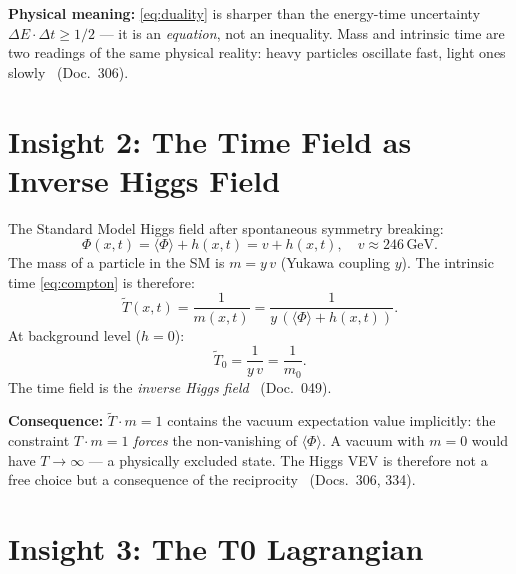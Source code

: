 \textbf{Physical meaning:} \eqref{eq:duality} is sharper than the
energy-time uncertainty $\Delta E \cdot \Delta t \geq 1/2$ --- it is an
\emph{equation}, not an inequality. Mass and intrinsic time are two readings
of the same physical reality: heavy particles oscillate fast, light ones
slowly \BM\ (Doc.~306).

\section{Insight 2: The Time Field as Inverse Higgs Field}

The Standard Model Higgs field after spontaneous symmetry breaking:
\begin{equation}
  \Phi(x,t) = \langle\Phi\rangle + h(x,t) = v + h(x,t),
  \quad v \approx 246\,\text{GeV}.
  \label{eq:higgs_field}
\end{equation}
The mass of a particle in the SM is $m = y\,v$ (Yukawa coupling $y$).
The intrinsic time \eqref{eq:compton} is therefore:
\begin{equation}
  \tilde{T}(x,t) = \frac{1}{m(x,t)} = \frac{1}{y\,(\langle\Phi\rangle + h(x,t))}.
  \label{eq:T_from_higgs}
\end{equation}
At background level ($h = 0$):
\begin{equation}
  \boxed{\tilde{T}_0 = \frac{1}{y\,v} = \frac{1}{m_0}.}
\end{equation}
The time field is the \emph{inverse Higgs field} \BM\ (Doc.~049).

\textbf{Consequence:} $\tilde{T}\cdot m = 1$ contains the vacuum expectation
value implicitly: the constraint $T\cdot m = 1$ \emph{forces} the
non-vanishing of $\langle\Phi\rangle$. A vacuum with $m = 0$ would have
$T \to \infty$ --- a physically excluded state. The Higgs VEV is therefore
not a free choice but a consequence of the reciprocity \BM\ (Docs.~306, 334).

\section{Insight 3: The T0 Lagrangian}

